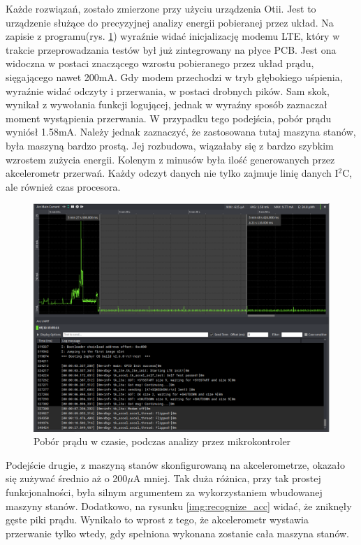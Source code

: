 Każde rozwiązań, zostało zmierzone przy użyciu urządzenia Otii. Jest to urządzenie służące do precyzyjnej analizy energii pobieranej przez układ.\cite{otii} Na zapisie z programu(rys. \ref{img:recognize_mcu}) wyraźnie widać inicjalizację modemu LTE, który w trakcie przeprowadzania testów był już zintegrowany na płyce PCB. Jest ona widoczna w postaci znaczącego wzrostu pobieranego przez układ prądu, sięgającego nawet 200mA. Gdy modem przechodzi w tryb głębokiego uśpienia, wyraźnie widać odczyty i przerwania, w postaci drobnych pików. Sam skok, wynikał z wywołania funkcji logującej, jednak w wyraźny sposób zaznaczał moment wystąpienia przerwania. W przypadku tego podejścia, pobór prądu wyniósł 1.58mA. Należy jednak zaznaczyć, że zastosowana tutaj maszyna stanów, była maszyną bardzo prostą. Jej rozbudowa, wiązałaby się z bardzo szybkim wzrostem zużycia energii. Kolenym z minusów była ilość generowanych przez akcelerometr przerwań. Każdy odczyt danych nie tylko zajmuje linię danych I$^{2}$C, ale również czas procesora. 
\begin{figure}[h]
    \centering
    \includegraphics[width=15cm]{Graphics/recognize_mcu.png}
    \caption{Pobór prądu w czasie, podczas analizy przez mikrokontroler}
    \label{img:recognize_mcu}
\end{figure}
\newline
Podejście drugie, z maszyną stanów skonfigurowaną na akcelerometrze, okazało się zużywać średnio aż o 200$\mu$A mniej. Tak duża różnica, przy tak prostej funkcjonalności, była silnym argumentem za wykorzystaniem wbudowanej maszyny stanów. Dodatkowo, na rysunku \ref{img:recognize_acc} widać, że zniknęły gęste piki prądu. Wynikało to wprost z tego, że akcelerometr wystawia przerwanie tylko wtedy, gdy spełniona wykonana zostanie cała maszyna stanów.

